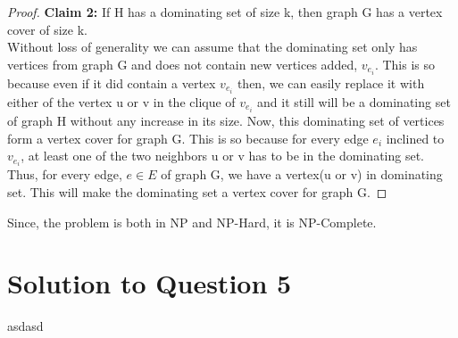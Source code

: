 \documentclass[11pt]{article}
\begin{document}
\begin{proof}
   \textbf{Claim 2:} If H has a dominating set of size k, then graph G has a vertex cover of size k.\\
   Without loss of generality we can assume that the dominating set only has vertices from graph G and does not contain new vertices added, $v_{e_i}$. This is so because even if it did contain a vertex $v_{e_i}$ then, we can easily replace it with either of the vertex u or v in the clique of $v_{e_i}$ and it still will be a dominating set of graph H without any increase in its size. Now, this dominating set of vertices form a vertex cover for graph G. This is so because for every edge $e_i$ inclined to $v_{e_i}$, at least one of the two neighbors u or v has to be in the dominating set. Thus, for every edge, $e \in E$ of graph G, we have a vertex(u or v) in dominating set. This will make the dominating set a vertex cover for graph G.
   \end{proof}
   Since, the problem is both in NP and NP-Hard, it is NP-Complete.

\newpage
\section{Solution to Question 5} 
asdasd
\end{document}
